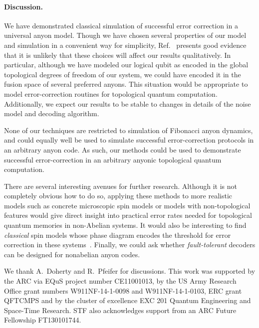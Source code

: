 \documentclass[aps, prl, letterpaper, twocolumn, superscriptaddress, notitlepage, 10pt]{revtex4}
\begin{document}
\paragraph{Discussion.}

We have demonstrated classical simulation of successful error correction in a universal anyon model. 
Though we have chosen several properties of our model and 
simulation in a convenient way for simplicity,
Ref.~\cite{Brell2013} presents good evidence that it is
unlikely that these choices will affect our results qualitatively.
In particular, although we have modeled our logical qubit as 
encoded in the global topological degrees of freedom of our 
system, we could have encoded it in the fusion space of several preferred anyons. 
This situation would be appropriate to model error-correction routines for topological quantum computation. 
Additionally, we expect our results to be stable to changes in details of the noise model and decoding algorithm.

None of our techniques are restricted to simulation of Fibonacci anyon dynamics, and could 
equally well be used to simulate successful error-correction protocols in an arbitrary anyon code. 
As such, our methods could be used to demonstrate successful 
error-correction in an arbitrary anyonic topological quantum computation.

There are several interesting avenues for further research. 
Although it is not completely obvious how to do so, 
applying these methods to more realistic models such as concrete 
microscopic spin models or models with non-topological features would give 
direct insight into practical error rates needed for topological quantum memories in non-Abelian systems. 
It would also be interesting to find \emph{classical} spin models 
whose phase diagram encodes the threshold for error correction in these systems~\cite{Dennis2002}.
Finally, we could ask whether 
\emph{fault-tolerant} decoders can be designed for nonabelian anyon codes. 


\acknowledgments 

We thank A.\ Doherty and R.\ Pfeifer for discussions. 
This work was supported by the ARC via EQuS project number CE11001013, by the US Army Research Office grant numbers W911NF-14-1-0098 and W911NF-14-1-0103, ERC grant QFTCMPS and by the cluster of excellence EXC 201 Quantum Engineering and Space-Time Research. STF also acknowledges support from an ARC Future Fellowship FT130101744.


\end{document}
